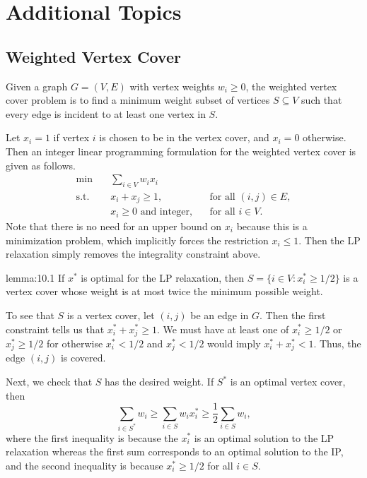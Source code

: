 \section{Additional Topics} \label{sec:10}

\subsection{Weighted Vertex Cover} \label{subsec:10.1}
Given a graph $G = (V, E)$ with vertex weights $w_i \geq 0$, the 
weighted vertex cover problem is to find a minimum weight subset of 
vertices $S \subseteq V$ such that every edge is incident to at least 
one vertex in $S$. 

Let $x_i = 1$ if vertex $i$ is chosen to be in the vertex cover, and 
$x_i = 0$ otherwise. Then an integer linear programming formulation for the 
weighted vertex cover is given as follows. 
\begin{align*}
    \min\quad & \sum_{i\in V} w_i x_i \\ 
    \text{s.t.}\quad & x_i + x_j \geq 1, && \text{for all } (i, j) \in E, \\  
    & x_i \geq 0 \text{ and integer}, && \text{for all } i \in V. 
\end{align*}
Note that there is no need for an upper bound on $x_i$ because this is 
a minimization problem, which implicitly forces the restriction $x_i \leq 1$.
Then the LP relaxation simply removes the integrality constraint above. 

\begin{lemma}{lemma:10.1}
    If $x^*$ is optimal for the LP relaxation, then $S = \{i \in V : x_i^* \geq 1/2\}$ 
    is a vertex cover whose weight is at most twice the minimum possible weight. 
\end{lemma}
\begin{pf}
    To see that $S$ is a vertex cover, let $(i, j)$ be an edge in $G$. Then the 
    first constraint tells us that $x_i^* + x_j^* \geq 1$. We must have at least 
    one of $x_i^* \geq 1/2$ or $x_j^* \geq 1/2$ for otherwise $x_i^* < 1/2$ 
    and $x_j^* < 1/2$ would imply $x_i^* + x_j^* < 1$. Thus, the edge 
    $(i, j)$ is covered. 

    Next, we check that $S$ has the desired weight. If $S^*$ is an optimal 
    vertex cover, then 
    \[ \sum_{i\in S^*} w_i \geq \sum_{i\in S} w_i x_i^* \geq \frac{1}{2} \sum_{i\in S} w_i, \] 
    where the first inequality is because the $x_i^*$ is an optimal solution to the 
    LP relaxation whereas the first sum corresponds to an optimal solution 
    to the IP, and the second inequality is because 
    $x_i^* \geq 1/2$ for all $i \in S$. 
\end{pf}

